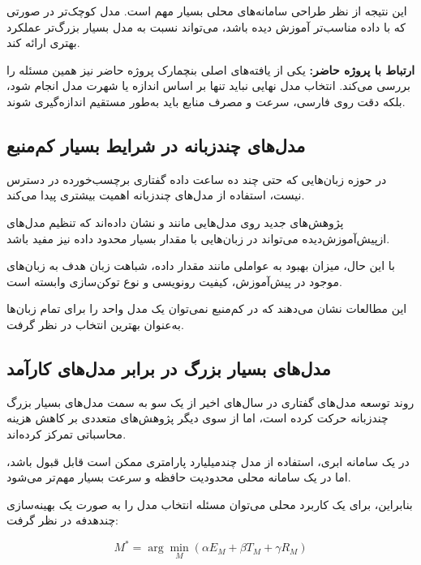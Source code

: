 این نتیجه از نظر طراحی سامانه‌های محلی بسیار مهم است.
مدل کوچک‌تر در صورتی که با داده مناسب‌تر آموزش دیده باشد،
می‌تواند نسبت به مدل بسیار بزرگ‌تر عملکرد بهتری ارائه کند.

\textbf{ارتباط با پروژه حاضر:}
یکی از یافته‌های اصلی بنچمارک پروژه حاضر نیز همین مسئله را
بررسی می‌کند.
انتخاب مدل نهایی نباید تنها بر اساس اندازه یا شهرت مدل انجام
شود، بلکه دقت روی فارسی، سرعت و مصرف منابع باید به‌طور مستقیم
اندازه‌گیری شوند.


\subsection{مدل‌های چندزبانه در شرایط بسیار کم‌منبع}

در حوزه زبان‌هایی که حتی چند ده ساعت داده گفتاری برچسب‌خورده
در دسترس نیست، استفاده از مدل‌های چندزبانه اهمیت بیشتری پیدا
می‌کند.

پژوهش‌های جدید روی مدل‌هایی مانند
و
نشان داده‌اند که تنظیم مدل‌های ازپیش‌آموزش‌دیده می‌تواند در
زبان‌هایی با مقدار بسیار محدود داده نیز مفید باشد.

با این حال، میزان بهبود به عواملی مانند مقدار داده،
شباهت زبان هدف به زبان‌های موجود در پیش‌آموزش،
کیفیت رونویسی و نوع توکن‌سازی وابسته است.

این مطالعات نشان می‌دهند که در  کم‌منبع نمی‌توان یک مدل
واحد را برای تمام زبان‌ها به‌عنوان بهترین انتخاب در نظر گرفت.


\subsection{مدل‌های بسیار بزرگ در برابر مدل‌های کارآمد}

روند توسعه مدل‌های گفتاری در سال‌های اخیر از یک سو به سمت
مدل‌های بسیار بزرگ چندزبانه حرکت کرده است، اما از سوی دیگر
پژوهش‌های متعددی بر کاهش هزینه محاسباتی تمرکز کرده‌اند.

در یک سامانه ابری، استفاده از مدل چندمیلیارد پارامتری ممکن است
قابل قبول باشد، اما در یک سامانه محلی محدودیت حافظه و سرعت
بسیار مهم‌تر می‌شود.

بنابراین، برای یک کاربرد محلی می‌توان مسئله انتخاب مدل را به
صورت یک بهینه‌سازی چندهدفه در نظر گرفت:

\begin{equation}
M^*
=
\arg\min_M
\left(
\alpha E_M
+
\beta T_M
+
\gamma R_M
\right)
\end{equation}

